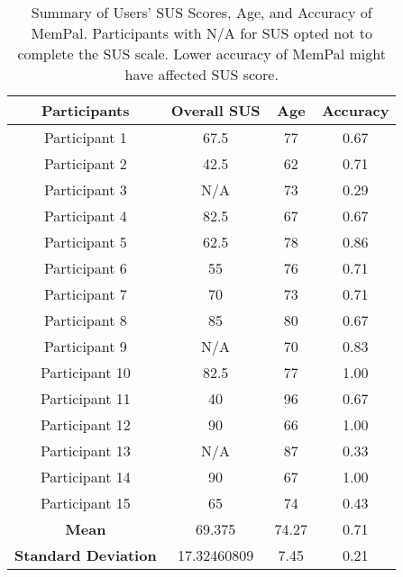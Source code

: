 
%

\begin{table*}
    \centering
    \begin{tabular}{cccc}
        \toprule
        \textbf{Participants} & \textbf{Overall SUS} & \textbf{Age} & \textbf{Accuracy} \\
        \midrule
        Participant 1 & 67.5 & 77 & 0.67 \\
        Participant 2 & 42.5 & 62 & 0.71 \\
        Participant 3 & N/A & 73 & 0.29 \\
        Participant 4 & 82.5 & 67 & 0.67 \\
        Participant 5 & 62.5 & 78 & 0.86 \\
        Participant 6 & 55 & 76 & 0.71 \\
        Participant 7 & 70 & 73 & 0.71 \\
        Participant 8 & 85 & 80 & 0.67 \\
        Participant 9 & N/A & 70 & 0.83 \\
        Participant 10 & 82.5 & 77 & 1.00 \\
        Participant 11 & 40 & 96 & 0.67 \\
        Participant 12 & 90 & 66 & 1.00 \\
        Participant 13 & N/A & 87 & 0.33 \\
        Participant 14 & 90 & 67 & 1.00 \\
        Participant 15 & 65 & 74 & 0.43 \\
        \midrule
        \textbf{Mean} & 69.375 & 74.27 & 0.71 \\
        \textbf{Standard Deviation} & 17.32460809 & 7.45 & 0.21 \\
        \bottomrule
    \end{tabular}
    \caption{Summary of Users' SUS Scores, Age, and Accuracy of MemPal. Participants with N/A for SUS opted not to complete the SUS scale. Lower accuracy of MemPal might have affected SUS score.}
    \label{tab:sus}
\end{table*}

%
